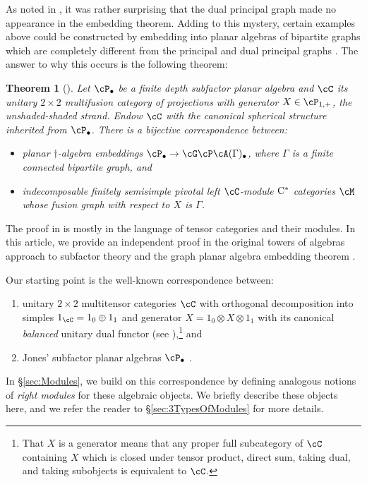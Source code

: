 \documentclass[11pt]{article}
\theoremstyle{plain}
\newtheorem{thm}{Theorem}[section]
\theoremstyle{definition}
\newcommand{\Cstar}{\rm{C^*}}
\begin{document}
As noted in \cite{MR2812459}, it was rather surprising that the dual principal graph made no appearance in the embedding theorem.
Adding to this mystery, certain examples above could be constructed by embedding into planar algebras of bipartite graphs which are completely different from the principal and dual principal graphs \cite{MR2679382,MR3402358,EH3}.
The answer to why this occurs is the following theorem:

\begin{thm}[\cite{EH3}]
Let $\cP_\bullet$ be a finite depth subfactor planar algebra and $\cC$ its unitary $2\times 2$ multifusion category of projections with generator $X \in \cP_{1,+}$, the unshaded-shaded strand.
Endow $\cC$ with the canonical spherical structure inherited from $\cP_\bullet$.
There is a bijective correspondence between:
\begin{itemize}
\item
planar $\dag$-algebra embeddings $\cP_\bullet \to \cG\cP\cA(\Gamma)_\bullet$, where $\Gamma$ is a finite connected bipartite graph, and 
\item
indecomposable finitely semisimple pivotal left $\cC$-module $\Cstar$ categories $\cM$ whose fusion graph with respect to $X$ is $\Gamma$.
\end{itemize}
\end{thm}

The proof in \cite{EH3} is mostly in the language of tensor categories and their modules.
In this article, we provide an independent proof in the original towers of algebras approach to subfactor theory \cite{MR936086,MR999799,MR1278111} and the graph planar algebra embedding theorem \cite{MR2812459}.

Our starting point is the well-known correspondence between:
\begin{enumerate}[label={\rm(\arabic*)}]
\item
unitary $2\times 2$ multitensor categories $\cC$ with orthogonal decomposition into simples $1_\cC = 1_0 \oplus 1_1$ and generator $X = 1_0 \otimes X \otimes 1_1$ with its canonical \emph{balanced} unitary dual functor
(see \cite{MR2091457,1808.00323}),\footnote{
That $X$ is a generator means that any proper full subcategory of $\cC$ containing $X$ which is closed under tensor product, direct sum, taking dual, and taking subobjects is equivalent to $\cC$. 
} 
and
\item
Jones' subfactor planar algebras $\cP_\bullet$ \cite{math.QA/9909027}.
\end{enumerate}
In \S\ref{sec:Modules}, we build on this correspondence by defining analogous notions of \emph{right modules} for these algebraic objects.
We briefly describe these objects here, and we refer the reader to \S\ref{sec:3TypesOfModules} for more details.
\end{document}

